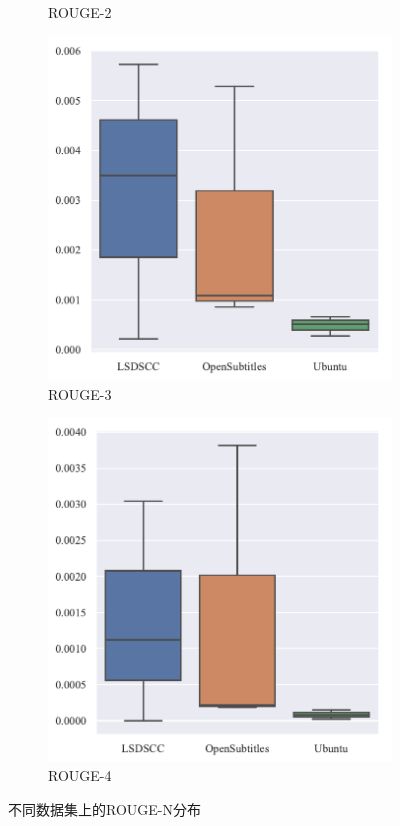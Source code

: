 \begin{figure}[H]
\begin{subfigure}{0.5\linewidth}
        \caption{ROUGE-2}
    \end{subfigure}
    \begin{subfigure}{0.5\linewidth}
        \centering
        \includegraphics[width=\linewidth]{figure/boxplot/dataset/rouge_3/plot.pdf}
        \caption{ROUGE-3}
    \end{subfigure}%
    \begin{subfigure}{0.5\linewidth}
        \centering
        \includegraphics[width=\linewidth]{figure/boxplot/dataset/rouge_4/plot.pdf}
        \caption{ROUGE-4}
    \end{subfigure}
    \centering
    \caption{不同数据集上的ROUGE-N分布}
    \label{fig:ROUGE_N_dataset}
\end{figure}
